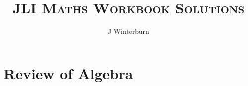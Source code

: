 \documentclass{article}
\begin{document}
\title{\Huge\textsc{JLI Maths Workbook Solutions}}
\author{J Winterburn}
\date{}

\maketitle
\thispagestyle{empty}

\clearpage


\section{Review of Algebra}
\end{document}
